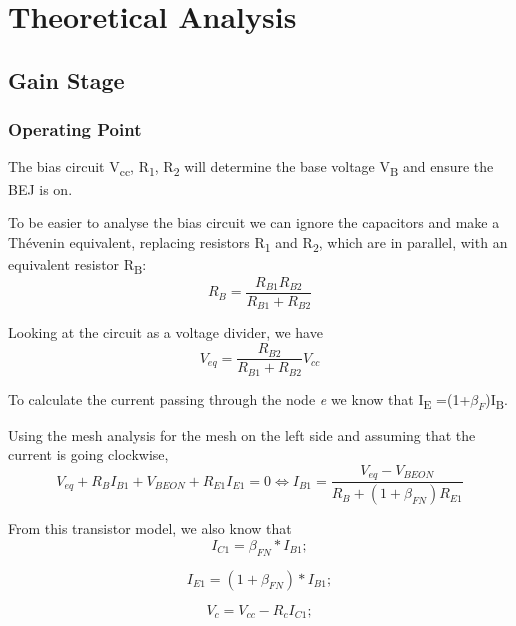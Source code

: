 \section{Theoretical Analysis} \label{sec:analysis}
 


\subsection{Gain Stage}
\subsubsection{Operating Point}
The bias circuit V\textsubscript{cc}, R\textsubscript1, R\textsubscript2 will determine the base voltage V\textsubscript B and ensure the BEJ is on.

To be easier to analyse the bias circuit we can ignore the capacitors and make a Thévenin equivalent, replacing resistors R\textsubscript{1} and R\textsubscript{2}, which are in parallel, with an equivalent resistor R\textsubscript{B}:
\begin{equation}
R_B = \frac{R_{B1} R_{B2}}{R_{B1}+R_{B2}}
\end{equation}

Looking at the circuit as a voltage divider, we have
\begin{equation}
V_{eq} = \frac{R_{B2}}{R_{B1}+R_{B2}} V_{cc}
\end{equation}

To calculate the current passing through the node \textit{e} we know that I\textsubscript E =(1+$\beta_F$)I\textsubscript B.

Using the mesh analysis for the mesh on the left side and assuming that the current is going clockwise,
\begin{equation}
V_{eq} + R_B I_{B1} + V_{BEON} + R_{E1} I_{E1} = 0 \Leftrightarrow I_{B1} = \frac{V_{eq}-V_{BEON}}{R_B + (1+\beta_{FN}) R_{E1}}
\end{equation}

From this transistor model, we also know that
\begin{equation}
 I_{C1}=\beta_{FN}*I_{B1};
\end{equation}

\begin{equation}
 I_{E1}=(1+\beta_{FN})*I_{B1};
\end{equation}

\begin{equation}
 V_{c}=V_{cc}-R_{c}I_{C1};
\end{equation}


